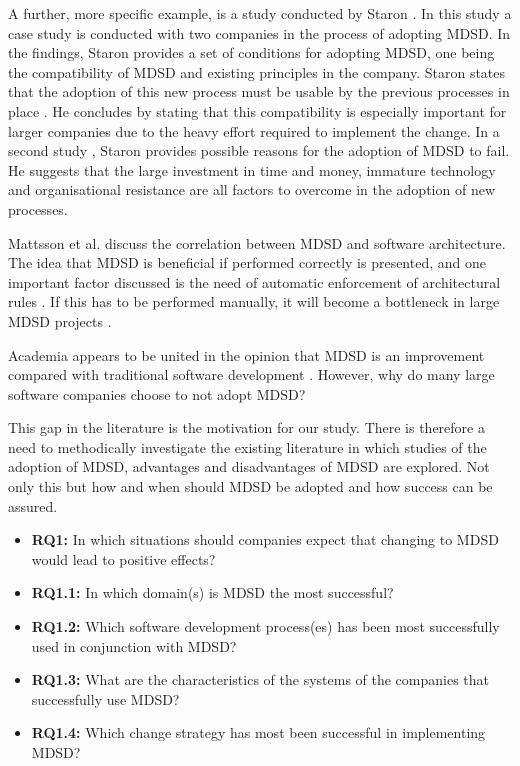 \documentclass[10pt,twocolumn]{article}
\begin{document}
A further, more specific example, is a study conducted by Staron \cite{staron2006adopting}. In this study a case study is conducted with two companies in the process of adopting MDSD. In the findings, Staron provides a set of conditions for adopting MDSD, one being the compatibility of MDSD and existing principles in the company. Staron states that the adoption of this new process must be usable by the previous processes in place \cite{staron2006adopting}. He concludes by stating that this compatibility is especially important for larger companies due to the heavy effort required to implement the change. In a second study \cite{staron2008transitioning}, Staron provides possible reasons for the adoption of MDSD to fail. He suggests that the large investment in time and money, immature technology and organisational resistance are all factors to overcome in the adoption of new processes.

Mattsson et al. \cite{mattsson2009linking} discuss the correlation between MDSD and software architecture. The idea that MDSD is beneficial if performed correctly is presented, and one important factor discussed is the need of automatic enforcement of architectural rules \cite{mattsson2009linking}. If this has to be performed manually, it will become a bottleneck in large MDSD projects \cite{mattsson2009linking}.


Academia appears to be united in the opinion that MDSD is an improvement compared with traditional software development \cite{staron2006adopting} \cite{volter2013model}. However, why do many large software companies choose to not adopt MDSD?

This gap in the literature is the motivation for our study. There is therefore a need to methodically investigate the existing literature in which studies of the adoption of MDSD, advantages and disadvantages of MDSD are explored. Not only this but how and when should MDSD be adopted and how success can be assured.

\begin{itemize}
\item \textbf{RQ1:} In which situations should companies expect that changing to MDSD would lead to positive effects? 
\item \textbf{RQ1.1:} In which domain(s) is MDSD the most successful? 
\item \textbf{RQ1.2:} Which software development process(es) has been most successfully used in conjunction with MDSD?
\item \textbf{RQ1.3:} What are the characteristics of the systems of the companies that successfully use MDSD?
\item \textbf{RQ1.4:} Which change strategy has most been successful in implementing MDSD? 
\end{itemize}
\end{document}
